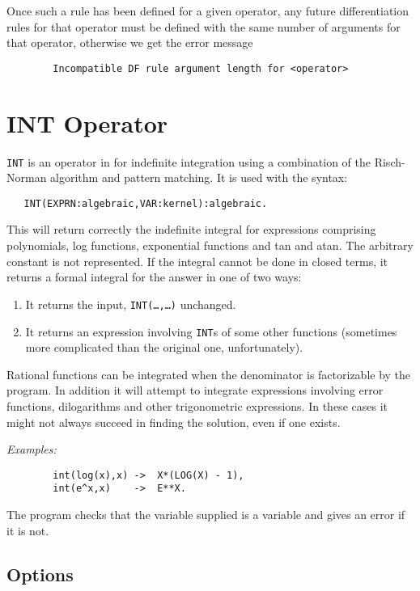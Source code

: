 Once such a rule has been defined for a given operator, any future
differentiation rules for that operator must be
defined with the same number of arguments for that operator, otherwise we
get the error message
\begin{verbatim}
        Incompatible DF rule argument length for <operator>
\end{verbatim}

\section{INT Operator}
{\tt INT}  is an operator in {\REDUCE} for indefinite
integration   using a
combination of the Risch-Norman algorithm and pattern matching.  It is
used with the syntax:
\begin{verbatim}
   INT(EXPRN:algebraic,VAR:kernel):algebraic.
\end{verbatim}
This will return correctly the indefinite integral for expressions comprising
polynomials, log functions, exponential functions and tan and atan. The
arbitrary constant is not represented. If the integral cannot be done in
closed terms, it returns a formal integral for the answer in one of two ways:
\begin{enumerate}
\item It returns the input, {\tt INT(\ldots,\ldots)} unchanged.

\item It returns an expression involving {\tt INT}s of some
      other functions (sometimes more complicated than
      the original one, unfortunately).
\end{enumerate}
Rational functions can be integrated when the denominator is factorizable
by the program. In addition it will attempt to integrate expressions
involving error functions, dilogarithms and other trigonometric
expressions. In these cases it might not always succeed in finding the
solution, even if one exists.

{\it Examples:}
\begin{verbatim}
        int(log(x),x) ->  X*(LOG(X) - 1),
        int(e^x,x)    ->  E**X.
\end{verbatim}
The program checks that the variable supplied is a variable and gives an
error if it is not.


\subsection{Options}

